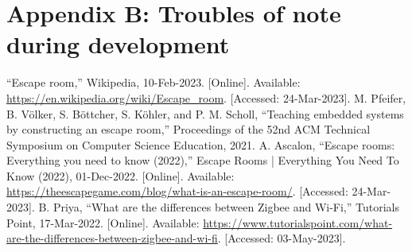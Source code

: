 \documentclass[conference]{IEEEtran}
\begin{document}
\section{Appendix B: Troubles of note during development}

\begin{thebibliography}{00}

     “Escape room,” Wikipedia, 10-Feb-2023. [Online]. Available: \url{https://en.wikipedia.org/wiki/Escape_room}. [Accessed: 24-Mar-2023].
     M. Pfeifer, B. Völker, S. Böttcher, S. Köhler, and P. M. Scholl, “Teaching embedded systems by constructing an escape room,” Proceedings of the 52nd ACM Technical Symposium on Computer Science Education, 2021.    
     A. Ascalon, “Escape rooms: Everything you need to know (2022),” Escape Rooms | Everything You Need To Know (2022), 01-Dec-2022. [Online]. Available:  \url{https://theescapegame.com/blog/what-is-an-escape-room/}. [Accessed: 24-Mar-2023].
     B. Priya, “What are the differences between Zigbee and Wi-Fi,” Tutorials Point, 17-Mar-2022. [Online]. Available: \url{https://www.tutorialspoint.com/what-are-the-differences-between-zigbee-and-wi-fi}. [Accessed: 03-May-2023].

\end{thebibliography}
\end{document}
